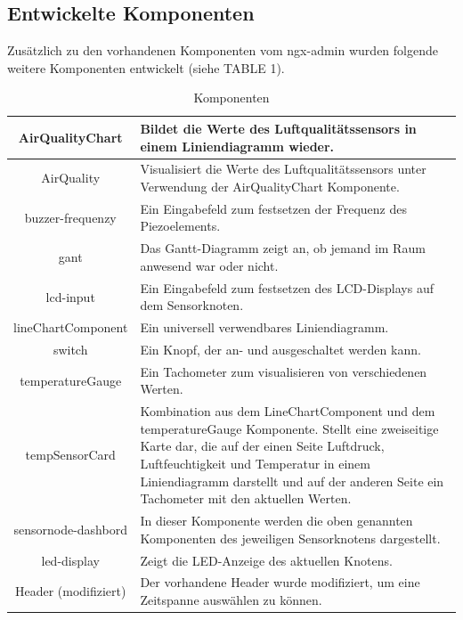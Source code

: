 \subsection{Entwickelte Komponenten}
Zusätzlich zu den vorhandenen Komponenten vom ngx-admin wurden folgende weitere Komponenten entwickelt (siehe TABLE 1).

\renewcommand{\arraystretch}{2}
\begin{table}[ht!]
  \centering
  \begin{tabular}{|c|p{4.4cm}|}
	\hline
	AirQualityChart & Bildet die Werte des Luftqualitätssensors in einem Liniendiagramm wieder. \\
	\hline
	AirQuality & Visualisiert die Werte des Luftqualitätssensors unter Verwendung der AirQualityChart Komponente. \\
	\hline
	buzzer-frequenzy & Ein Eingabefeld zum festsetzen der Frequenz des Piezoelements. \\
	\hline
	gant & Das Gantt-Diagramm zeigt an, ob jemand im Raum anwesend war oder nicht. \\
	\hline
    lcd-input & Ein Eingabefeld zum festsetzen des LCD-Displays auf dem Sensorknoten. \\
	\hline
	lineChartComponent & Ein universell verwendbares Liniendiagramm. \\
	\hline
	switch & Ein Knopf, der an- und ausgeschaltet werden kann. \\
	\hline
	temperatureGauge & Ein Tachometer zum visualisieren von verschiedenen Werten. \\
	\hline
	tempSensorCard & Kombination aus dem LineChartComponent und dem temperatureGauge Komponente. Stellt eine zweiseitige Karte dar, die auf der einen Seite Luftdruck, Luftfeuchtigkeit und Temperatur in einem Liniendiagramm darstellt und auf der anderen Seite ein Tachometer mit den aktuellen Werten. \\
	\hline
	sensornode-dashbord & In dieser Komponente werden die oben genannten Komponenten des jeweiligen Sensorknotens dargestellt. \\
	\hline
	led-display & Zeigt die LED-Anzeige des aktuellen Knotens. \\
	\hline
	Header (modifiziert) & Der vorhandene Header wurde modifiziert, um eine Zeitspanne auswählen zu können. \\
	\hline
  \end{tabular}
  \caption{Komponenten}
  \label{tab:beispiel}
\end{table}


